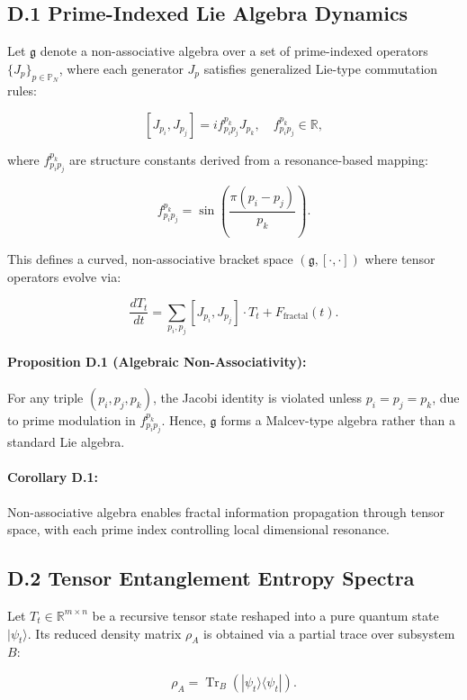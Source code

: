 \documentclass[12pt]{article}
\begin{document}
\begin{itemize}
\subsection*{D.1 Prime-Indexed Lie Algebra Dynamics}

Let \(\mathfrak{g}\) denote a non-associative algebra over a set of prime-indexed operators \(\{J_p\}_{p \in \mathbb{P}_N}\), where each generator \(J_p\) satisfies generalized Lie-type commutation rules:

\[
[J_{p_i}, J_{p_j}] = i f_{p_i p_j}^{p_k} J_{p_k}, \quad f_{p_i p_j}^{p_k} \in \mathbb{R},
\]

where \(f_{p_i p_j}^{p_k}\) are structure constants derived from a resonance-based mapping:

\[
f_{p_i p_j}^{p_k} = \sin\left( \frac{\pi (p_i - p_j)}{p_k} \right).
\]

This defines a curved, non-associative bracket space \((\mathfrak{g}, [\cdot,\cdot])\) where tensor operators evolve via:

\[
\frac{dT_t}{dt} = \sum_{p_i, p_j} [J_{p_i}, J_{p_j}] \cdot T_t + F_{\text{fractal}}(t).
\]

\paragraph{Proposition D.1 (Algebraic Non-Associativity):}
For any triple \((p_i, p_j, p_k)\), the Jacobi identity is violated unless \(p_i = p_j = p_k\), due to prime modulation in \(f_{p_i p_j}^{p_k}\). Hence, \(\mathfrak{g}\) forms a Malcev-type algebra rather than a standard Lie algebra.

\paragraph{Corollary D.1:}
Non-associative algebra enables fractal information propagation through tensor space, with each prime index controlling local dimensional resonance.

\subsection*{D.2 Tensor Entanglement Entropy Spectra}

Let \(T_t \in \mathbb{R}^{m \times n}\) be a recursive tensor state reshaped into a pure quantum state \(|\psi_t\rangle\). Its reduced density matrix \(\rho_A\) is obtained via a partial trace over subsystem \(B\):

\[
\rho_A = \operatorname{Tr}_B(|\psi_t\rangle \langle \psi_t|).
\]


\end{itemize}
\end{document}
